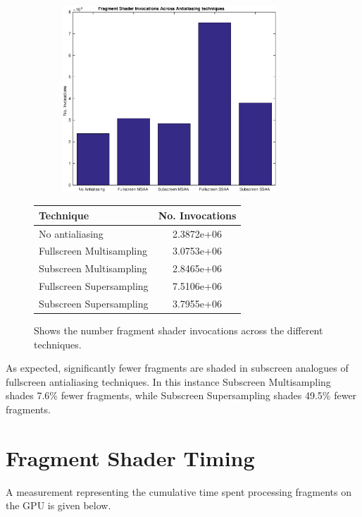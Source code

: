 \documentclass[12pt,a4paper,twoside,openright]{report}
\begin{document}
\begin{figure}[tbh]

 
\begin{subfigure}{0.5\textwidth}
\includegraphics[height=7cm]{figs/fsInvocations.eps}
\end{subfigure}
\qquad
\begin{tabular}{l|c}
Technique   & No. Invocations \\ 
\hline
No antialiasing      & 2.3872e+06 \\
Fullscreen Multisampling     & 3.0753e+06 \\
Subscreen Multisampling    &  2.8465e+06  \\
Fullscreen Supersampling      &  7.5106e+06   \\
Subscreen Supersampling    &  3.7955e+06  \\
\end{tabular}
 
\caption{Shows the number fragment shader invocations across the different techniques.}
\end{figure}

As expected, significantly fewer fragments are shaded in subscreen analogues of fullscreen antialiasing techniques. In this instance Subscreen Multisampling shades 7.6\% fewer fragments, while Subscreen Supersampling shades 49.5\% fewer fragments.

\clearpage

\section{Fragment Shader Timing}

A measurement representing the cumulative time spent processing fragments on the GPU is given below.
\end{document}
